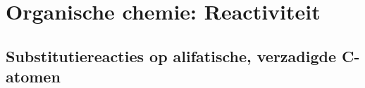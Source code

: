 \documentclass[a4paper,12pt]{article}
\begin{document}
    \maketitle

    \section{Organische chemie: Reactiviteit}
    \subsection*{Substitutiereacties op alifatische, verzadigde C-atomen}
\end{document}
